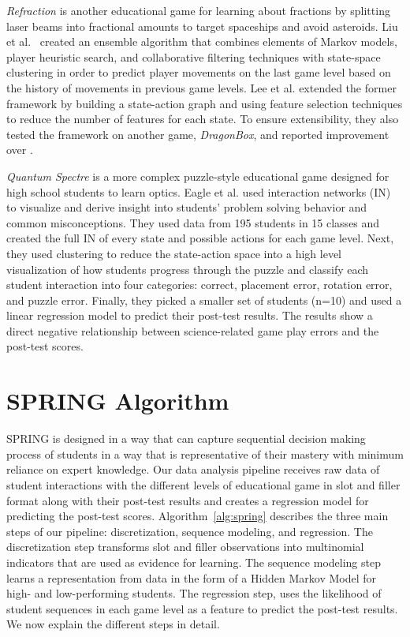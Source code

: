 \documentclass{sigchi}
\def\algname{SPRING\xspace}
\begin{document}
\textit {Refraction} \cite{andersen2010gameplay} is another educational game for learning about fractions by splitting laser beams into fractional amounts to target spaceships and avoid asteroids. 
Liu et al.~\cite{liu2013predicting} created an ensemble algorithm that combines elements of Markov models, player heuristic search, and collaborative filtering techniques with state-space clustering in order to predict player movements on the last game level based on the history of movements in previous game levels. 
Lee et al. \cite{lee2014learning} extended the former framework by building a state-action graph and using feature selection techniques to reduce the number of features for each state. 
To ensure extensibility, they also tested the framework on another game, \textit {DragonBox}, and reported improvement over \cite{liu2013predicting}.

\textit {Quantum Spectre} is a more complex puzzle-style educational game designed for high school students to learn optics. 
Eagle et al. \cite{eagle2015measuring} used interaction networks (IN) to visualize and derive insight into students' problem solving behavior and common misconceptions. 
They used data from 195 students in 15 classes and created the full IN of every state and possible actions for each game level. 
Next, they used clustering to reduce the state-action space into a high level visualization of how students progress through the puzzle and classify each student interaction into four categories: correct, placement error, rotation error, and puzzle error. 
Finally, they picked a smaller set of students (n=10) and used a linear regression model to predict their post-test results.
The results show a direct negative relationship between science-related game play errors and the post-test scores.

\section{SPRING Algorithm}

\algname is designed in a way that can capture sequential decision making process of students in a way that is representative of their mastery with minimum reliance on expert knowledge. 
Our data analysis pipeline receives raw data of student interactions with the different levels of educational game in slot and filler format along with their post-test results and creates a regression model for predicting the post-test scores. 
Algorithm~\ref{alg:spring} describes the three main steps of our pipeline: discretization,  sequence modeling, and regression.
The discretization step transforms slot and filler observations into multinomial indicators that are used as evidence for learning.
The sequence modeling step learns a representation from data in the form of a Hidden Markov Model for high- and low-performing students.
The regression step, uses the likelihood of student sequences in each game level as a feature to predict the post-test results.
We now explain the different steps in detail.
\end{document}
